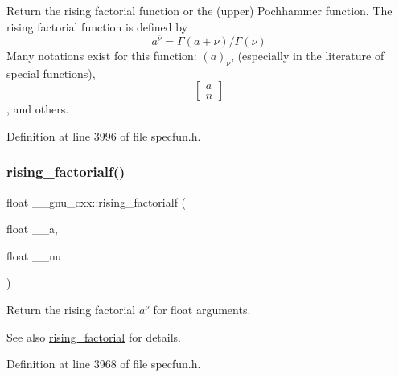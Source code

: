 Return the rising factorial function or the (upper) Pochhammer function. The rising factorial function is defined by \[ a^{\overline{\nu}} = \Gamma(a + \nu) / \Gamma(\nu) \] Many notations exist for this function\+: $ (a)_\nu $, (especially in the literature of special functions), \[ \left[ \begin{array}{c} a \\ n \end{array} \right] \], and others. 



Definition at line 3996 of file specfun.\+h.

\mbox{\label{group__gnu__math__spec__func_ga10da05b995a42f0b0625e61186af7449}} 
\subsubsection{\texorpdfstring{rising\+\_\+factorialf()}{rising\_factorialf()}}
{\footnotesize\ttfamily float \+\_\+\+\_\+gnu\+\_\+cxx\+::rising\+\_\+factorialf (\begin{DoxyParamCaption}\item[{float}]{\+\_\+\+\_\+a,  }\item[{float}]{\+\_\+\+\_\+nu }\end{DoxyParamCaption})\hspace{0.3cm}{\ttfamily [inline]}}

Return the rising factorial $ a^{\overline{\nu}} $ for float arguments.

\begin{DoxySeeAlso}{See also}
\hyperlink{group__gnu__math__spec__func_gae8c36a0e1f60254cf212a3806f7c675c}{rising\+\_\+factorial} for details. 
\end{DoxySeeAlso}


Definition at line 3968 of file specfun.\+h.

\mbox{\label{group__gnu__math__spec__func_gac9a399ae01c315aa78a64b445795d974}} 
